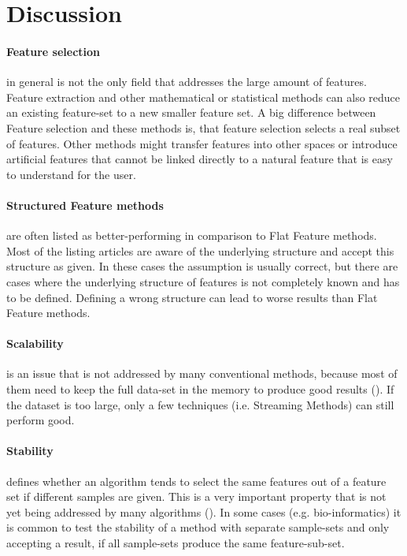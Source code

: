 \section{Discussion}
\label{sec:discussion}

\paragraph{Feature selection} in general is not the only field that addresses
the large amount of features. Feature extraction and other mathematical or
statistical methods can also reduce an existing feature-set to a new smaller
feature set. A big difference between Feature selection and these methods is,
that feature selection selects a real subset of features. Other methods might
transfer features into other spaces or introduce artificial features that cannot
be linked directly to a natural feature that is easy to understand for the user.

\paragraph{Structured Feature methods} are often listed as better-performing in
comparison to Flat Feature methods. Most of the listing articles are aware of
the underlying structure and accept this structure as given. In these cases the
assumption is usually correct, but there are cases where the underlying
structure of features is not completely known and has to be defined. Defining a
wrong structure can lead to worse results than Flat Feature methods. 

\paragraph{Scalability} is an issue that is not addressed by many conventional
methods, because most of them need to keep the full data-set in the memory to
produce good results (\cite{Tang:14}). If the dataset is too large, only a few
techniques (i.e. Streaming Methods) can still perform good.

\paragraph{Stability} defines whether an algorithm tends to select the same
features out of a feature set if different samples are given. This is a very
important property that is not yet being addressed by many algorithms
(\cite{Tang:14}). In some cases (e.g. bio-informatics) it is common to test the
stability of a method with separate sample-sets and only accepting a result, if
all sample-sets produce the same feature-sub-set.

